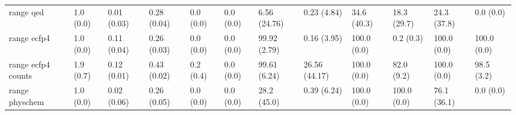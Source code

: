 \begin{tabular}{llllllllllll}
range qed & {\cellcolor[HTML]{F5FBFC}} \color[HTML]{000000} 1.0 (0.0) & {\cellcolor[HTML]{F7FCFD}} \color[HTML]{000000} 0.01 (0.03) & {\cellcolor[HTML]{BFE7DE}} \color[HTML]{000000} 0.28 (0.04) & {\cellcolor[HTML]{F7FCFD}} \color[HTML]{000000} 0.0 (0.0) & {\cellcolor[HTML]{F7FCFD}} \color[HTML]{000000} 0.0 (0.0) & {\cellcolor[HTML]{EEF8FB}} \color[HTML]{000000} 6.56 (24.76) & {\cellcolor[HTML]{F7FCFD}} \color[HTML]{000000} 0.23 (4.84) & {\cellcolor[HTML]{A5DDD0}} \color[HTML]{000000} 34.6 (40.3) & {\cellcolor[HTML]{DAF1F1}} \color[HTML]{000000} 18.3 (29.7) & {\cellcolor[HTML]{CDECE7}} \color[HTML]{000000} 24.3 (37.8) & {\cellcolor[HTML]{F7FCFD}} \color[HTML]{000000} 0.0 (0.0) \\
range ecfp4 & {\cellcolor[HTML]{F2FAFC}} \color[HTML]{000000} 1.0 (0.0) & {\cellcolor[HTML]{E6F5F9}} \color[HTML]{000000} 0.11 (0.04) & {\cellcolor[HTML]{C8EBE4}} \color[HTML]{000000} 0.26 (0.03) & {\cellcolor[HTML]{F7FCFD}} \color[HTML]{000000} 0.0 (0.0) & {\cellcolor[HTML]{F7FCFD}} \color[HTML]{000000} 0.0 (0.0) & {\cellcolor[HTML]{00441B}} \color[HTML]{F1F1F1} 99.92 (2.79) & {\cellcolor[HTML]{F7FCFD}} \color[HTML]{000000} 0.16 (3.95) & {\cellcolor[HTML]{00441B}} \color[HTML]{F1F1F1} 100.0 (0.0) & {\cellcolor[HTML]{F7FCFD}} \color[HTML]{000000} 0.2 (0.3) & {\cellcolor[HTML]{00441B}} \color[HTML]{F1F1F1} 100.0 (0.0) & {\cellcolor[HTML]{00441B}} \color[HTML]{F1F1F1} 100.0 (0.0) \\
range ecfp4 counts & {\cellcolor[HTML]{F6FCFD}} \color[HTML]{000000} 1.9 (0.7) & {\cellcolor[HTML]{F7FCFD}} \color[HTML]{000000} 0.12 (0.01) & {\cellcolor[HTML]{84CFB9}} \color[HTML]{000000} 0.43 (0.02) & {\cellcolor[HTML]{F7FCFD}} \color[HTML]{000000} 0.2 (0.4) & {\cellcolor[HTML]{F7FCFD}} \color[HTML]{000000} 0.0 (0.0) & {\cellcolor[HTML]{00441B}} \color[HTML]{F1F1F1} 99.61 (6.24) & {\cellcolor[HTML]{C5E9E2}} \color[HTML]{000000} 26.56 (44.17) & {\cellcolor[HTML]{00441B}} \color[HTML]{F1F1F1} 100.0 (0.0) & {\cellcolor[HTML]{107A37}} \color[HTML]{F1F1F1} 82.0 (9.2) & {\cellcolor[HTML]{00441B}} \color[HTML]{F1F1F1} 100.0 (0.0) & {\cellcolor[HTML]{00481D}} \color[HTML]{F1F1F1} 98.5 (3.2) \\
range physchem & {\cellcolor[HTML]{F6FCFD}} \color[HTML]{000000} 1.0 (0.0) & {\cellcolor[HTML]{F7FCFD}} \color[HTML]{000000} 0.02 (0.06) & {\cellcolor[HTML]{C8EBE4}} \color[HTML]{000000} 0.26 (0.05) & {\cellcolor[HTML]{F7FCFD}} \color[HTML]{000000} 0.0 (0.0) & {\cellcolor[HTML]{F7FCFD}} \color[HTML]{000000} 0.0 (0.0) & {\cellcolor[HTML]{BFE7DE}} \color[HTML]{000000} 28.2 (45.0) & {\cellcolor[HTML]{F6FCFD}} \color[HTML]{000000} 0.39 (6.24) & {\cellcolor[HTML]{00441B}} \color[HTML]{F1F1F1} 100.0 (0.0) & {\cellcolor[HTML]{00441B}} \color[HTML]{F1F1F1} 100.0 (0.0) & {\cellcolor[HTML]{208843}} \color[HTML]{F1F1F1} 76.1 (36.1) & {\cellcolor[HTML]{F7FCFD}} \color[HTML]{000000} 0.0 (0.0) \\

\end{tabular}
